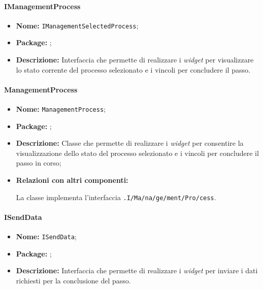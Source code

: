 \paragraph{IManagementProcess}
\begin{itemize}
\item \textbf{Nome:} \texttt{IManagementSelectedProcess};
\item \textbf{Package:} \texttt{\viewUser{}};
\item \textbf{Descrizione:} Interfaccia che permette di realizzare i \textit{widget} per visualizzare lo stato corrente del processo selezionato e i vincoli per concludere il passo.
\end{itemize}

\paragraph{ManagementProcess}
\begin{flushleft}
\begin{itemize}
\item \textbf{Nome:} \texttt{ManagementProcess};
\item \textbf{Package:} \texttt{\viewUser{}};
\item \textbf{Descrizione:} Classe che permette di realizzare i \textit{widget} per consentire la visualizzazione dello stato del processo selezionato e i vincoli per concludere il passo in corso;
\item \textbf{Relazioni con altri componenti:}
\begin{sloppypar}
La classe implementa l'interfaccia \texttt{\viewUser{}.I\fshyp{}Ma\fshyp{}na\fshyp{}ge\fshyp{}ment\fshyp{}Pro\fshyp{}cess}.
\end{sloppypar}
\end{itemize}
\end{flushleft}

\paragraph{ISendData}
\begin{itemize}
\item \textbf{Nome:} \texttt{ISendData};
\item \textbf{Package:} \texttt{\viewUser{}};
\item \textbf{Descrizione:} Interfaccia che permette di realizzare i \textit{widget} per inviare i dati richiesti per la conclusione del passo.
\end{itemize}

